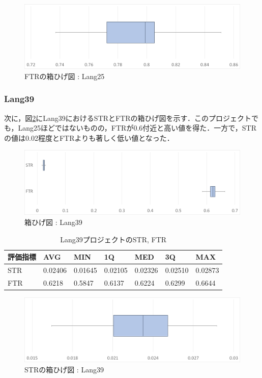 \documentclass[uplatex,dvipdfmx,a4paper]{jsarticle}
\begin{document}
\begin{figure}[t]
  \centering
  \includegraphics[width=\linewidth]{fig/Lang25_boxplot_FTR.png}
  \caption{FTRの箱ひげ図 : Lang25}
  \label{fig:Lang25_boxplot_FTR}
\end{figure}
\subsubsection{Lang39}
次に，図\ref{fig:Lang39_boxplot}にLang39におけるSTRとFTRの箱ひげ図を示す．このプロジェクトでも，Lang25ほどではないものの，FTRが0.6付近と高い値を得た．一方で，STRの値は0.02程度とFTRよりも著しく低い値となった．
\begin{figure}[t]
  \centering
  \includegraphics[width=\linewidth]{fig/Lang39_boxplot.png}
  \caption{箱ひげ図 : Lang39}
  \label{fig:Lang39_boxplot}
\end{figure}
\begin{table}[b]
  \centering
  \caption{Lang39プロジェクトのSTR, FTR}
  \label{tab:Lang39}
  \begin{tabular}{l|llllll} \hline\hline
    評価指標 & AVG         & MIN & 1Q & MED & 3Q & MAX   \\\hline
    STR & 0.02406 & 0.01645 & 0.02105 & 0.02326 & 0.02510 & 0.02873  \\
    FTR & 0.6218 & 0.5847 & 0.6137 & 0.6224 & 0.6299 & 0.6644 \\\hline\hline
  \end{tabular}
\end{table}
\begin{figure}[t]
  \centering
  \includegraphics[width=\linewidth]{fig/Lang39_boxplot_STR.png}
  \caption{STRの箱ひげ図 : Lang39}
  \label{fig:Lang39_boxplot_STR}
\end{figure}
\end{document}
